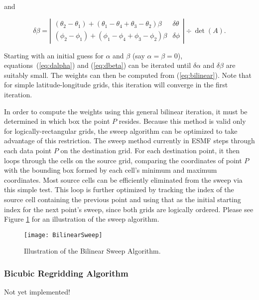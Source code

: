      and

\begin{equation}\label{eq:dbeta}
\delta\beta = \left|\begin{array}{cc}
(\theta_2-\theta_1) + (\theta_1-\theta_4+\theta_3-\theta_2)\beta &
\delta\theta \\
(\phi_2-\phi_1) + (\phi_1-\phi_4+\phi_3-\phi_2)\beta &
\delta\phi 
\end{array}\right| \div \det(A).
\end{equation}

     Starting with an initial guess for $\alpha$ and $\beta$ (say 
     $\alpha=\beta=0$), equations~(\ref{eq:dalpha}) and (\ref{eq:dbeta})
     can be iterated until $\delta\alpha$ and $\delta\beta$ are suitably small.
     The weights can then be computed from (\ref{eq:bilinear}).  Note that
     for simple latitude-longitude grids, this iteration will converge in the
     first iteration.

     In order to compute the weights using this general bilinear iteration,
     it must be determined in which box the point $P$ resides.  Because this
     method is valid only for logically-rectangular grids, the sweep algorithm
     can be optimized to take advantage of this restriction.  The sweep
     method currently in ESMF steps through each data point $P$ on the destination
     grid.  For each destination point, it then loops through the cells on the
     source grid, comparing the coordinates of point $P$ with the bounding box
     formed by each cell's minimum and maximum coordinates.  Most source cells can
     be efficiently eliminated from the sweep via this simple test.  This loop is
     further optimized by tracking the index of the source cell containing the
     previous point and using that as the initial starting index for the next
     point's sweep, since both grids are logically ordered.  Please see
     Figure \ref{fig:BilinearSweep} for an illustration of the sweep algorithm.

\begin{center}
\begin{figure}
\caption{Illustration of the Bilinear Sweep Algorithm. }
\label{fig:BilinearSweep}
\texttt{[image: BilinearSweep]}
\end{figure}
\end{center}


\subsubsection{Bicubic Regridding Algorithm}  Not yet implemented!
\label{sec:BicubicRegrid}

